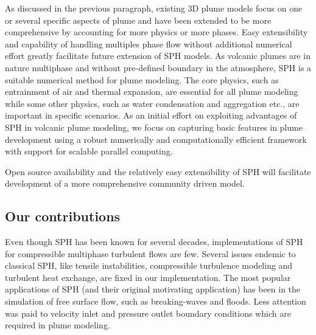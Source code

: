 \documentclass[journal abbreviation, manuscript]{copernicus}
\begin{document}
As discussed in the previous paragraph, existing 3D plume models focus on one or several specific aspects of plume and have been extended to be more comprehensive by accounting for more physics or more phases. Easy extensibility and capability of handling multiples phase flow without additional numerical effort greatly facilitate future extension of SPH models. As volcanic plumes are in nature multiphase and without pre-defined boundary in the atmosphere, SPH is a suitable numerical method for plume modeling. The core physics, such as entrainment of air and thermal expansion, are essential for all plume modeling while some other physics, such as water condensation and aggregation etc., are important in specific scenarios. As an initial effort on exploiting advantages of SPH in volcanic plume modeling, we focus on capturing basic features in plume development using a robust numerically and computationally efficient framework with support for scalable parallel computing. %

Open source availability and the relatively easy extensibility of SPH will facilitate development of a more comprehensive community driven model.

\subsection{Our contributions}
Even though SPH has been known for several decades, implementations of SPH for compressible multiphase turbulent flows are few. Several issues endemic to classical SPH, like tensile instabilities,  compressible turbulence modeling and turbulent heat exchange, are fixed in our implementation. The most popular applications of SPH (and their original motivating application) has been in the simulation of free surface flow, such as breaking-waves and floods. Less attention was paid to velocity inlet and pressure outlet boundary conditions which are required in plume modeling.
 
\end{document}
